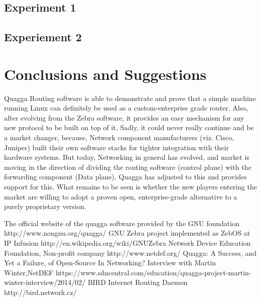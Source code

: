 \documentclass{article}
\begin{document}
\subsection{Experiment 1}
\subsection{Experiement 2}
\clearpage
\section{Conclusions and Suggestions}
Quagga Routing software is able to demonstrate and prove that a simple machine running Linux can definitely
be used as a custom-enterprise grade router. Also, after evolving from the Zebra software, it provides an
easy mechanism for any new protocol to be built on top of it. Sadly, it could never really continue and
be a market changer, because, Network component manufacturers (viz. Cisco, Juniper) built their own software
stacks for tighter integration with their hardware systems. But today, Networking in general has evolved, and
market is moving in the direction of dividing the routing software (control plane) with the forwarding
component (Data plane). Quagga has adjusted to this and provides support for this. What remains to be seen
is whether the new players entering the market are willing to adopt a proven open, enterprise-grade 
alternative to a purely proprietary version.
%
%
\begin{thebibliography}{9}
  The official website of the quagga software provided by the GNU foundation http://www.nongnu.org/quagga/
  GNU Zebra project implemented as ZebOS at IP Infusion http://en.wikipedia.org/wiki/GNU\textunderscore Zebra
   Network Device Education Foundation, Non-profit company http://www.netdef.org/
   Quagga: A Success, and Yet a Failure, of Open-Source In Networking? Interview with Martin Winter,NetDEF https://www.sdncentral.com/education/quagga-project-martin-winter-interview/2014/02/
   BIRD Internet Routing Daemon http://bird.network.cz/
\end{thebibliography}
\end{document}
